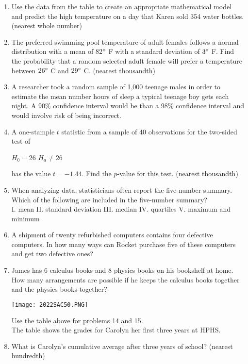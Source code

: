 \documentclass[../uilmath.tex]{subfiles}
\begin{document}
\begin{enumerate}[label=\bfseries\arabic*.]
    \item %
    Use the data from the table to create an appropriate mathematical model and predict the high temperature on a day that Karen sold 354 water bottles. (nearest whole number)

    \item %
    The preferred swimming pool temperature of adult females follows a normal distribution with a mean of 82$\degree$ F with a standard deviation of $3\degree$ F. Find the probability that a random selected adult female 
    will prefer a temperature between $26\degree$ C and $29\degree$ C. (nearest thousandth)

    \item %
    A researcher took a random sample of 1,000 teenage males in order to estimate the mean number hours of sleep a typical 
    teenage boy gets each night. A 90\% confidence interval would be \blank than a 98\% confidence interval and would involve 
    \blank risk of being incorrect.

    \item %
    A one-stample $t$ statistic from a sample of 40 observations for the two-sided test of 
    \begin{center}
        $H_0 = 26$ \qquad $H_a\neq 26$
    \end{center}
    has the value $t=-1.44$. Find the $p$-value for this test. (nearest thousandth)

    \item %
    When analyzing data, statisticians often report the five-number summary. Which of the following are included in the five-number summary?\\
    I. mean \quad II. standard deviation \quad III. median \quad IV. quartiles \quad V. maximum and minimum

    \item %
    A shipment of twenty refurbished computers contains four defective computers. In how many ways 
    can Rocket purchase five of these computers and get two defective ones?

    \item %
    James has 6 calculus books and 8 physics books on his bookshelf at home. How many arrangements are possible if he keeps the calculus books together and the physics books together?


    \begin{center}
        \texttt{[image: 2022SAC50.PNG]}
    \end{center}
    Use the table above for problems 14 and 15.\\
    The table shows the grades for Carolyn her first three years at HPHS.
    \item %
    What is Carolyn's cumulative average after three years of school? (nearest hundredth)


\end{enumerate}
\end{document}
